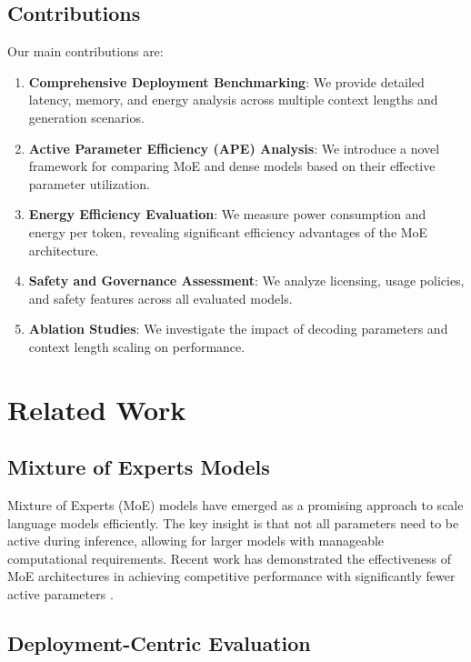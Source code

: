 \documentclass[11pt]{article}
\begin{document}
\subsection{Contributions}

Our main contributions are:

\begin{enumerate}
    \item \textbf{Comprehensive Deployment Benchmarking}: We provide detailed latency, memory, and energy analysis across multiple context lengths and generation scenarios.
    
    \item \textbf{Active Parameter Efficiency (APE) Analysis}: We introduce a novel framework for comparing MoE and dense models based on their effective parameter utilization.
    
    \item \textbf{Energy Efficiency Evaluation}: We measure power consumption and energy per token, revealing significant efficiency advantages of the MoE architecture.
    
    \item \textbf{Safety and Governance Assessment}: We analyze licensing, usage policies, and safety features across all evaluated models.
    
    \item \textbf{Ablation Studies}: We investigate the impact of decoding parameters and context length scaling on performance.
\end{enumerate}

\section{Related Work}

\subsection{Mixture of Experts Models}

Mixture of Experts (MoE) models have emerged as a promising approach to scale language models efficiently. The key insight is that not all parameters need to be active during inference, allowing for larger models with manageable computational requirements. Recent work has demonstrated the effectiveness of MoE architectures in achieving competitive performance with significantly fewer active parameters \cite{shazeer2017outrageously, lepikhin2020gshard, fedus2021switch}.

\subsection{Deployment-Centric Evaluation}
\end{document}
